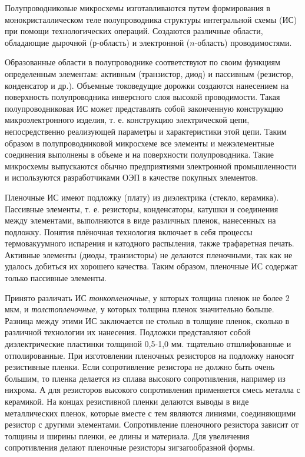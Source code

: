Полупроводниковые микросхемы изготавливаются путем формирования в монокристаллическом теле полупроводника структуры интегральной схемы (ИС) при помощи технологических операций. Создаются различные области, обладающие дырочной ($ р $-область) и электронной ($ n $-область) проводимостями.

Образованные области в полупроводнике соответствуют по своим функциям определенным элементам: активным (транзистор, диод) и пассивным (резистор, конденсатор и др.). Объемные токоведущие дорожки создаются нанесением на поверхность полупроводника инверсного слоя высокой проводимости. Такая полупроводниковая ИС может представлять собой законченную конструкцию микроэлектронного изделия, т. е. конструкцию электрической цепи, непосредственно реализующей параметры и характеристики этой цепи. Таким образом в полупроводниковой микросхеме все элементы и межэлементные соединения выполнены в объеме и на поверхности полупроводника. Такие микросхемы выпускаются обычно предприятиями электронной промышленности и используются разработчиками ОЭП в качестве покупных элементов.

Пленочные ИС имеют подложку (плату) из диэлектрика (стекло, керамика). Пассивные элементы, т. е. резисторы, конденсаторы, катушки и соединения между элементами, выполняются в виде различных пленок, нанесенных на подложку. Понятия плёночная технология включает в себя процессы термовакуумного испарения и катодного распыления, также трафаретная печать. Активные элементы (диоды, транзисторы) не делаются пленочными, так как не удалось добиться их хорошего качества. Таким образом, пленочные ИС содержат только пассивные элементы.

Принято различать ИС \textit{тонкопленочные}, у которых толщина пленок не более 2 мкм, и \textit{толстопленочные}, у которых толщина пленок значительно больше. Разница между этими ИС заключается не столько в толщине пленок, сколько в различной технологии их нанесения. Подложки представляют собой диэлектрические пластинки толщиной 0,5-1,0 мм. тщательно отшлифованные и отполированные. При изготовлении пленочных резисторов на подложку наносят резистивные пленки. Если сопротивление резистора не должно быть очень большим, то пленка делается из сплава высокого сопротивления, например из нихрома. А для резисторов высокого сопротивления применяется смесь металла с керамикой. На концах резистивной пленки делаются выводы в виде металлических пленок, которые вместе с тем являются линиями, соединяющими резистор с другими элементами. Сопротивление пленочного резистора зависит от толщины и ширины пленки, ее длины и материала. Для увеличения сопротивления делают пленочные резисторы зигзагообразной формы. 

